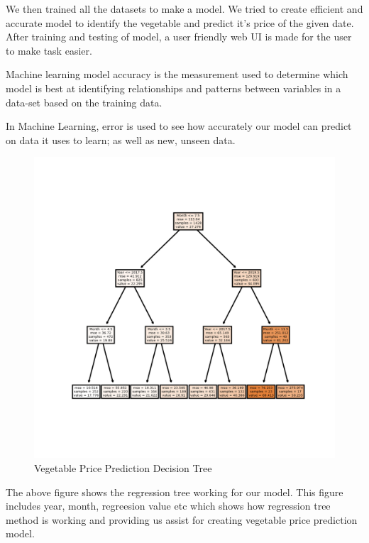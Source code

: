 We then trained all the datasets to make a model. We tried to create efficient and accurate model to identify the vegetable and predict it's price of the given date. After training and testing of model, a user friendly web UI is made for the user to make task easier.

Machine learning model accuracy is the measurement used to determine which model
is best at identifying relationships and patterns between variables in a data-set based on
the training data. 

In Machine Learning, error is used to see how accurately our model can predict on data it uses to learn; as well as new, unseen data.

\begin{figure}[H]
	\centering
	\includegraphics[width=140mm]{images/DecisionTree_1.png}
	\caption{Vegetable Price Prediction Decision Tree} %
	\label{figresult} %
\end{figure}
The above figure shows the regression tree working for our model. This figure includes year, month, regreesion value etc which shows how regression tree method is working and providing us assist for creating vegetable price prediction model. 

